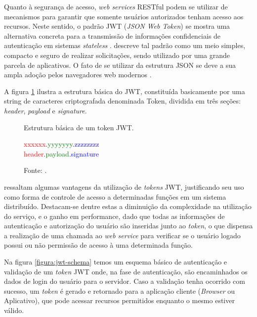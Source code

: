 Quanto à segurança de acesso, \textit{web services} RESTful podem se utilizar de mecanismos para garantir que somente usuários autorizados tenham acesso aos recursos. Neste sentido, o padrão JWT (\textit{JSON Web Token}) \cite{jwt} se mostra uma alternativa concreta para a transmissão de informações confidenciais de autenticação em sistemas \textit{stateless} \cite{jones2015json}.  descreve tal padrão como um meio simples, compacto e seguro de realizar solicitações, sendo utilizado por uma grande parcela de aplicativos. O fato de se utilizar da estrutura JSON se deve a sua ampla adoção pelos  navegadores web modernos \cite{jones2011emerging}.

A figura \ref{figura:jwt} ilustra a estrutura básica do JWT, constituída basicamente por uma string de caracteres criptografada denominada Token, dividida em três seções: \textit{header}, \textit{payload} e \textit{signature}.

\begin{figure}[H]
	\caption{Estrutura básica de um token JWT.}
	\label{figura:jwt}
	\begin{center}
		\textcolor{red}{xxxxxx}.\textcolor{green}{yyyyyyy}.\textcolor{blue}{zzzzzzzz}\\
		\textcolor{red}{header}.\textcolor{green}{payload}.\textcolor{blue}{signature}\\
	\end{center}
	\caption*{\footnotesize Fonte: .}
\end{figure}

 ressaltam algumas vantagens da utilização de \textit{tokens} JWT, justificando seu uso como forma de controle de acesso a determinadas funções em um sistema distribuído. Destacam-se dentre estas a diminuição da complexidade na utilização do serviço, e o ganho em performance, dado que todas as informações de autenticação e autorização do usuário são inseridas junto ao \textit{token}, o que dispensa a realização de uma chamada ao \textit{web service} para verificar se o usuário logado possui ou não permissão de acesso à uma determinada função.

Na figura \ref{figura:jwt-schema} temos um esquema básico de autenticação e validação de um \textit{token} JWT onde, na fase de autenticação, são encaminhados os dados de login do usuário para o servidor. Caso a validação tenha ocorrido com sucesso, um \textit{token} é gerado e retornado para a aplicação cliente (\textit{Browser} ou Aplicativo), que pode acessar recursos permitidos enquanto o mesmo estiver válido.

